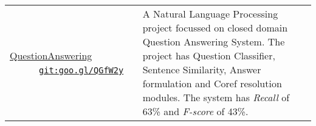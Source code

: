 \documentclass[8pt]{article}
\begin{document}
\begin{tabular}[t]{@{}>{\raggedright\arraybackslash}p{\textwidth-\rcollength-150pt}p{\rcollength+150pt}}
        \href{https://github.com/debjyoti385/QuestionAnswerNLP}{QuestionAnswering} ~~~~~~\href{https://goo.gl/QGfW2y}{\scriptsize\texttt{git:goo.gl/QGfW2y}} & \hspace{0.5cm} A Natural Language Processing project focussed on closed domain Question Answering System. The project has Question Classifier, Sentence Similarity, Answer formulation and Coref resolution modules. The system has \emph{Recall} of  63\% and \emph{F-score} of 43\%.   \\[0.1cm]
\end{tabular}
\end{document}
